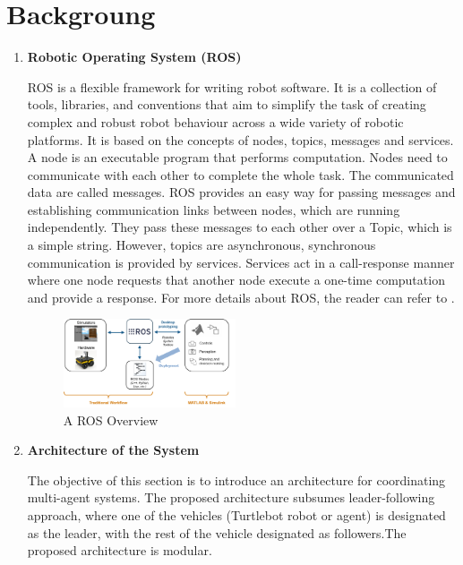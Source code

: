 \documentclass[journal]{IEEEtran}
\begin{document}
\section{Backgroung}
\begin{enumerate}
\item \textbf{Robotic Operating System (ROS)}

ROS is a flexible framework for writing robot software. It is a collection of tools, libraries, and conventions that aim to simplify the task of creating complex and robust robot behaviour across a wide variety of robotic platforms. It is based on the concepts of nodes, topics, messages and services. A node is an executable program that performs computation. Nodes need to communicate with each other to complete the whole task. The communicated data are called messages. ROS provides an easy way for passing messages and establishing communication links between nodes, which are running independently. They pass these messages to each other over a Topic, which is a simple string. However, topics are asynchronous, synchronous communication is provided by services. Services act in a call-response manner where one node requests that another node execute a one-time computation and provide a response. For more details about ROS, the reader can refer to \cite{temp2}.

\begin{figure}[!h]
\begin{center}
\includegraphics[width=2in]{6.png}
\caption{A ROS Overview \cite{temp2}}
\end{center}
\end{figure}




\item \textbf{Architecture of the System}



The objective of this section is to introduce an architecture for coordinating multi-agent systems. The proposed architecture subsumes leader-following approach, where one of the vehicles (Turtlebot robot or agent) is designated as the leader, with the rest of the vehicle designated as followers.The proposed architecture is modular.



\end{enumerate}
\end{document}
